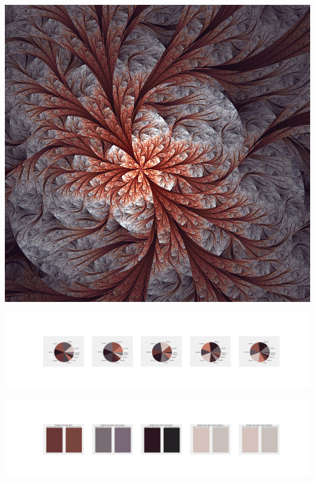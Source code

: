 \documentclass[11pt]{article}
\begin{document}
\begin{landscape}
    \begin{center}
    \includegraphics[width=\textwidth]{./nbimg/file (309).jpg}
    \end{center}

    \begin{center}
    \includegraphics[width=250mm]{./nbimg/pie-233.jpg}
    \end{center}

    \begin{center}
    \includegraphics[width=250mm]{./nbimg/peak-233.jpg}
    \end{center}
    


\end{landscape}
\end{document}
